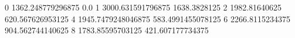 0 1362.248779296875 0.0
1 3000.631591796875 1638.3828125
2 1982.81640625 620.567626953125
4 1945.7479248046875 583.4991455078125
6 2266.8115234375 904.562744140625
8 1783.85595703125 421.607177734375
